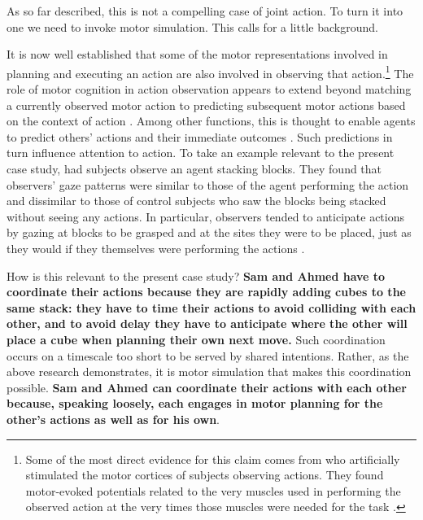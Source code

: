 \documentclass[12pt,a4paper]{extarticle}
\begin{document}
As so far described, this is not a compelling case of joint action.  To turn it into one we need to invoke motor simulation.  This calls for a little background.

It is now well established that some of the motor representations involved in planning and executing an action are also involved in observing that action.\footnote{
Some of the most direct evidence for this claim comes from \citet{Gangitano:2001ft} who artificially stimulated the motor cortices of subjects observing actions.  They found motor-evoked potentials related to the very muscles used in performing the observed action at the very times those muscles were needed for the task \citep[see further][]{Fadiga:2005gq}.  
}
The role of motor cognition in action observation appears to extend beyond matching a currently observed motor action to predicting subsequent motor actions based on the context of action \citep[e.g.][]{Iacoboni:2005ww,hamilton_action_2008}.  Among other functions, this is thought to enable agents to predict others' actions and their immediate outcomes \citep{Wolpert:2003mg,Wilson:2005qu}.  Such predictions in turn influence attention to action.  To take an example relevant to the present case study, \citet{Flanagan:2003lm} had subjects observe an agent stacking blocks.  They found that observers' gaze patterns were similar to those of the agent performing the action and dissimilar to those of control subjects who saw the blocks being stacked without seeing any actions.  In particular, observers tended to anticipate actions by gazing at blocks to be grasped and at the sites they were to be placed, just as they would if they themselves were performing the actions \citep[see further][]{Rotman:2006xf}.  

How is this relevant to the present case study?  \textbf{Sam and Ahmed have to coordinate their actions because they are rapidly adding cubes to the same stack: they have to time their actions to avoid colliding with each other, and to avoid delay they have to anticipate where the other will place a cube when planning their own next move.}  Such coordination occurs on a timescale too short to be served by shared intentions.  Rather, as the above research demonstrates, it is motor simulation that makes this coordination possible.  \textbf{Sam and Ahmed can coordinate their actions with each other because, speaking loosely, each engages in motor planning for the other's actions as well as for his own}.  
\end{document}
